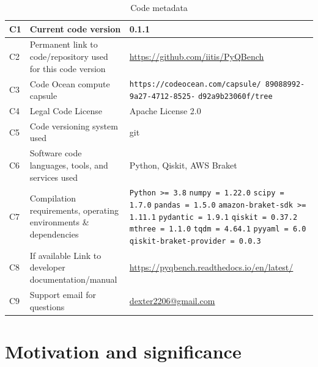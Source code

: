 \documentclass[preprint,12pt, a4paper, dvipsnames]{elsarticle}
\newcommand{\1}{{\rm 1\hspace{-0.9mm}l}}
\newcommand{\textapprox}{\raisebox{0.5ex}{\texttildelow}}
\theoremstyle{definition}
\begin{document}
\begin{table}[H]
\begin{tabular}{|l|p{5.5cm}|p{7.5cm}|}
\hline
C1 & Current code version & 0.1.1 \\
\hline
C2 & Permanent link to code/repository used for this code version & \url{https://github.com/iitis/PyQBench} \\
\hline
C3 & Code Ocean compute capsule & \texttt{https://codeocean.com/capsule/ 89088992-9a27-4712-8525-} \texttt{d92a9b23060f/tree}\\
\hline
C4 & Legal Code License & Apache License 2.0\\
\hline
C5 & Code versioning system used & git \\
\hline
C6 & Software code languages, tools, and services used & Python, Qiskit, AWS Braket \\
\hline
C7 & Compilation requirements, operating environments \& dependencies &
\texttt{Python >= 3.8}\newline
\texttt{numpy \textapprox= 1.22.0}\newline
\texttt{scipy \textapprox= 1.7.0}\newline
\texttt{pandas \textapprox= 1.5.0}\newline
\texttt{amazon-braket-sdk >= 1.11.1}\newline
\texttt{pydantic \textapprox= 1.9.1}\newline
\texttt{qiskit \textapprox= 0.37.2}\newline
\texttt{mthree \textapprox= 1.1.0}\newline
\texttt{tqdm \textapprox= 4.64.1}\newline
\texttt{pyyaml \textapprox= 6.0}\newline
\texttt{qiskit-braket-provider \textapprox= 0.0.3}\\
\hline
C8 & If available Link to developer documentation/manual &
\url{https://pyqbench.readthedocs.io/en/latest/}\\
\hline
C9 & Support email for questions & \url{dexter2206@gmail.com}\\
\hline
\end{tabular}
\caption{Code metadata}
\label{}
\end{table}


\linenumbers

\section{Motivation and significance}
\end{document}
